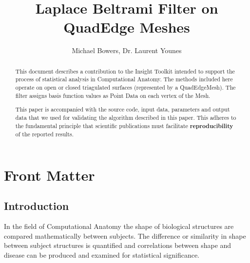 \documentclass{InsightArticle}
\title{Laplace Beltrami Filter on QuadEdge Meshes}
\author{Michael Bowers, Dr. Laurent Younes}
\newcommand{\IJhandlerIDnumber}{3063}
\begin{document}
%
% 
\IJhandlefooter{\IJhandlerIDnumber}


\ifpdf
\else
\fi


\maketitle


\ifhtml
\chapter*{Front Matter\label{front}}
\fi


\begin{abstract}
\noindent
This document describes a contribution to the Insight Toolkit intended to
support the process of statistical analysis in Computational Anatomy.
The methods included here operate
on open or closed triagulated surfaces (represented by a QuadEdgeMesh).
The filter assigns basis function values as Point Data on each 
vertex of the Mesh.

This paper is accompanied with the source code, input data, parameters and
output data that we used for validating the algorithm described in this paper.
This adheres to the fundamental principle that scientific publications must
facilitate \textbf{reproducibility} of the reported results.
\end{abstract}

\tableofcontents

\section{Introduction}

In the field of Computational Anatomy the shape of biological structures are
compared mathematically between subjects.  The difference or similarity in shape
between subject structures is quantified and correlations between shape and
disease can be produced and examined for statistical significance.
\end{document}

